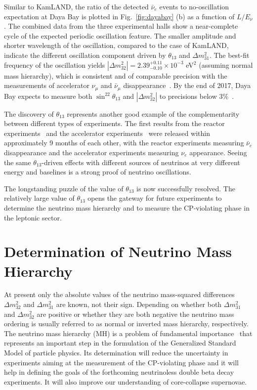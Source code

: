\documentclass[aps,twocolumn,preprintnumbers,amsmath,superscriptaddress,amssymb,floats,nofootinbib]{revtex4-1}
\begin{document}
Similar to KamLAND, the ratio of the detected $\bar\nu_{e}$ events to no-oscillation expectation at Daya Bay is plotted in Fig.~\ref{fig:dayabay} (b) as a function of $L/E_{\nu}$.
The combined data from the three experimental halls show a near-complete cycle of the expected periodic oscillation feature.
The smaller amplitude and shorter wavelength of the oscillation, compared to the case of KamLAND, indicate the different oscillation component driven by $\theta_{13}$ and $\Delta{m}^2_{31}$.
The best-fit frequency of the oscillation yields $|\Delta{m}^2_{32}| = 2.39^{+0.11}_{-0.10} \times 10^{-3}$ eV$^2$ (assuming normal mass hierarchy), which is consistent and of comparable precision with the measurements of accelerator $\nu_\mu$ and $\bar\nu_\mu$ disappearance~\cite{MINOS2014,T2K2014}.
By the end of 2017, Daya Bay expects to measure both $\sin^22\theta_{13}$ and $|\Delta{m}^2_{32}|$ to precisions below 3\%~\cite{Zhang-Neutrino14}.

The discovery of $\theta_{13}$ represents another good example of the complementarity between different types of experiments. The first results from the reactor experiments~\cite{DChooz,Dayabay,Reno} and the accelerator experiments~\cite{T2K2011,MINOS2011} were released within approximately 9 months of each other, with the reactor experiments measuring $\bar\nu_e$ disappearance and the accelerator experiments measuring $\nu_e$ appearance. Seeing the same $\theta_{13}$-driven effects with different sources
of neutrinos at very different energy and baselines is a strong proof of neutrino oscillations.

The longstanding puzzle of the value of $\theta_{13}$ is now successfully resolved.
The relatively large value of $\theta_{13}$ opens the gateway for future experiments to determine the neutrino mass hierarchy and
to measure the CP-violating phase in the leptonic sector.


\section{Determination of Neutrino Mass Hierarchy}

At present only the absolute values of the neutrino mass-squared differences $\Delta m^2_{32}$ and $\Delta m^2_{31}$ are known, not their sign.
Depending on whether both $\Delta m^2_{31}$ and $\Delta m^2_{32}$ are positive or whether they are both negative the neutrino mass ordering is usually referred to as normal or inverted mass hierarchy, respectively.
The neutrino mass hierarchy (MH) is a problem of fundamental importance~\cite{MHwhitepaper} that represents an important step in the formulation of the Generalized Standard Model of particle physics.
Its determination will reduce the uncertainty in experiments aiming at the measurement of the CP-violating phase
and it will help in defining the goals of the forthcoming neutrinoless double beta decay experiments.
It will also improve our understanding of core-collapse supernovae.
\end{document}

